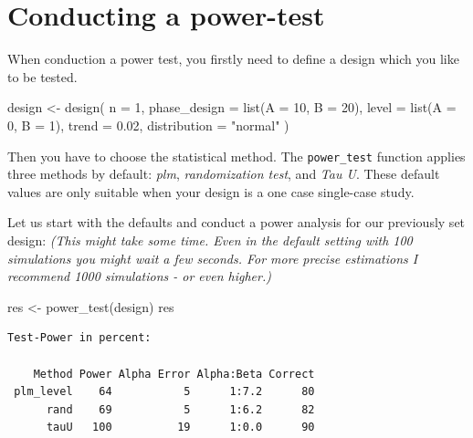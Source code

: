 \documentclass[
  letterpaper,
  DIV=11,
  numbers=noendperiod]{scrreprt}
\newenvironment{Shaded}{\begin{snugshade}}{\end{snugshade}}
\newcommand{\AttributeTok}[1]{\textcolor[rgb]{0.40,0.45,0.13}{#1}}
\newcommand{\DecValTok}[1]{\textcolor[rgb]{0.68,0.00,0.00}{#1}}
\newcommand{\FloatTok}[1]{\textcolor[rgb]{0.68,0.00,0.00}{#1}}
\newcommand{\FunctionTok}[1]{\textcolor[rgb]{0.28,0.35,0.67}{#1}}
\newcommand{\NormalTok}[1]{\textcolor[rgb]{0.00,0.23,0.31}{#1}}
\newcommand{\OtherTok}[1]{\textcolor[rgb]{0.00,0.23,0.31}{#1}}
\newcommand{\StringTok}[1]{\textcolor[rgb]{0.13,0.47,0.30}{#1}}
\begin{document}
\hypertarget{conducting-a-power-test}{%
\section{Conducting a power-test}\label{conducting-a-power-test}}

When conduction a power test, you firstly need to define a design which
you like to be tested.

\begin{Shaded}
\begin{Highlighting}[]
\NormalTok{design }\OtherTok{\textless{}{-}} \FunctionTok{design}\NormalTok{(}
  \AttributeTok{n =} \DecValTok{1}\NormalTok{,}
  \AttributeTok{phase\_design =} \FunctionTok{list}\NormalTok{(}\AttributeTok{A =} \DecValTok{10}\NormalTok{, }\AttributeTok{B =} \DecValTok{20}\NormalTok{),}
  \AttributeTok{level =} \FunctionTok{list}\NormalTok{(}\AttributeTok{A =} \DecValTok{0}\NormalTok{, }\AttributeTok{B =} \DecValTok{1}\NormalTok{),}
  \AttributeTok{trend =} \FloatTok{0.02}\NormalTok{,}
  \AttributeTok{distribution =} \StringTok{"normal"}
\NormalTok{)}
\end{Highlighting}
\end{Shaded}

Then you have to choose the statistical method. The \texttt{power\_test}
function applies three methods by default: \emph{plm},
\emph{randomization test}, and \emph{Tau U}. These default values are
only suitable when your design is a one case single-case study.

Let us start with the defaults and conduct a power analysis for our
previously set design: \emph{(This might take some time. Even in the
default setting with 100 simulations you might wait a few seconds. For
more precise estimations I recommend 1000 simulations - or even
higher.)}

\begin{Shaded}
\begin{Highlighting}[]
\NormalTok{res }\OtherTok{\textless{}{-}} \FunctionTok{power\_test}\NormalTok{(design)}
\NormalTok{res}
\end{Highlighting}
\end{Shaded}

\begin{verbatim}
Test-Power in percent:

    Method Power Alpha Error Alpha:Beta Correct
 plm_level    64           5      1:7.2      80
      rand    69           5      1:6.2      82
      tauU   100          19      1:0.0      90
\end{verbatim}
\end{document}
